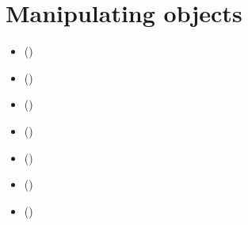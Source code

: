 \documentclass[a4paper,10pt,english]{sphinxhowto}
\begin{document}
\section{Manipulating  objects}
\label{\detokenize{tutorial:manipulating-digraph-objects}}\label{\detokenize{tutorial:digraph-tools-label}}
\begin{sphinxShadowBox}
\begin{itemize}
\item {} 
\label{\detokenize{tutorial:id170}}{\hyperref[\detokenize{tutorial:random-digraph}]{}} ()

\item {} 
\label{\detokenize{tutorial:id171}}{\hyperref[\detokenize{tutorial:graphviz-drawings}]{}} ()

\item {} 
\label{\detokenize{tutorial:id172}}{\hyperref[\detokenize{tutorial:asymmetric-and-symmetric-parts}]{}} ()

\item {} 
\label{\detokenize{tutorial:id173}}{\hyperref[\detokenize{tutorial:border-and-inner-parts}]{}} ()

\item {} 
\label{\detokenize{tutorial:id174}}{\hyperref[\detokenize{tutorial:fusion-by-epistemic-disjunction}]{}} ()

\item {} 
\label{\detokenize{tutorial:id175}}{\hyperref[\detokenize{tutorial:dual-converse-and-codual-digraphs}]{}} ()

\item {} 
\label{\detokenize{tutorial:id176}}{\hyperref[\detokenize{tutorial:symmetric-and-transitive-closures}]{}} ()


\end{itemize}
\end{sphinxShadowBox}
\end{document}
